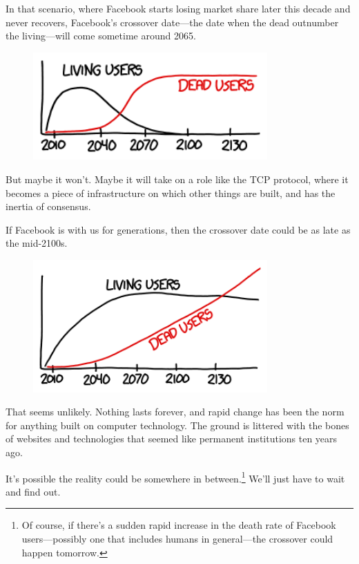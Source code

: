 {{In that scenario, where Facebook starts losing market share later this decade and never recovers, Facebook's crossover date—the date when the dead outnumber the living—will come sometime around 2065.}

\begin{figure}[!htbp]
\centering
\includegraphics[scale=0.5, max width=0.8\textwidth]{imgs/a/69/facebook_early.png}
\caption{}
\end{figure}

{But maybe it won't. Maybe it will take on a role like the TCP protocol, where it becomes a piece of infrastructure on which other things are built, and has the inertia of consensus.}

{If Facebook is with us for generations, then the crossover date could be as late as the mid-2100s.}

\begin{figure}[!htbp]
\centering
\includegraphics[scale=0.5, max width=0.8\textwidth]{imgs/a/69/facebook_late.png}
\caption{}
\end{figure}

{That seems unlikely. Nothing lasts forever, and rapid change has been the norm for anything built on computer technology. The ground is littered with the bones of websites and technologies that seemed like permanent institutions ten years ago.}

{It's possible the reality could be somewhere in between.{\footnote{Of course, if there's a sudden rapid increase in the death rate of Facebook users—possibly one that includes humans in general—the crossover could happen tomorrow.} } We'll just have to wait and find out.}

}
